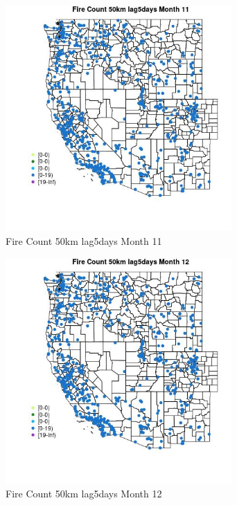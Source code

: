 \begin{figure} 
\centering  
\includegraphics[width=0.77\textwidth]{Code_Outputs/Report_ML_input_PM25_Step4_part_e_de_duplicated_aves_compiled_2019-05-21wNAs_MapObsMo11Fire_Count_50km_lag5days.jpg} 
\caption{\label{fig:Report_ML_input_PM25_Step4_part_e_de_duplicated_aves_compiled_2019-05-21wNAsMapObsMo11Fire_Count_50km_lag5days}Fire Count 50km lag5days Month 11} 
\end{figure} 
 

\begin{figure} 
\centering  
\includegraphics[width=0.77\textwidth]{Code_Outputs/Report_ML_input_PM25_Step4_part_e_de_duplicated_aves_compiled_2019-05-21wNAs_MapObsMo12Fire_Count_50km_lag5days.jpg} 
\caption{\label{fig:Report_ML_input_PM25_Step4_part_e_de_duplicated_aves_compiled_2019-05-21wNAsMapObsMo12Fire_Count_50km_lag5days}Fire Count 50km lag5days Month 12} 
\end{figure} 
 

